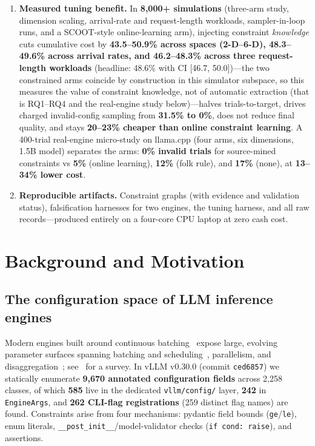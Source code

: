 \documentclass[journal]{IEEEtran}
\newcommand{\code}[1]{\texttt{#1}}
\begin{document}
\begin{enumerate}
  \item \textbf{Measured tuning benefit.} In \textbf{8{,}000+ simulations} (three-arm study, dimension scaling, arrival-rate and request-length workloads, sampler-in-loop runs, and a SCOOT-style online-learning arm), injecting constraint \emph{knowledge} cuts cumulative cost by \textbf{43.5--50.9\% across spaces (2-D--6-D), 48.3--49.6\% across arrival rates, and 46.2--48.3\% across three request-length workloads} (headline: 48.6\% with CI [46.7, 50.0])---the two constrained arms coincide by construction in this simulator subspace, so this measures the value of constraint knowledge, not of automatic extraction (that is RQ1--RQ4 and the real-engine study below)---halves trials-to-target, drives charged invalid-config sampling from \textbf{31.5\% to 0\%}, does not reduce final quality, and stays \textbf{20--23\% cheaper than online constraint learning}. A 400-trial real-engine micro-study on llama.cpp (four arms, six dimensions, 1.5B model) separates the arms: \textbf{0\% invalid trials} for source-mined constraints vs \textbf{5\%} (online learning), \textbf{12\%} (folk rule), and \textbf{17\%} (none), at \textbf{13--34\% lower cost}.
  \item \textbf{Reproducible artifacts.} Constraint graphs (with evidence and validation status), falsification harnesses for two engines, the tuning harness, and all raw records---produced entirely on a four-core CPU laptop at zero cash cost.
\end{enumerate}

\section{Background and Motivation}

\subsection{The configuration space of LLM inference engines}

Modern engines built around continuous batching~\cite{ref15} expose large, evolving parameter surfaces spanning batching and scheduling~\cite{ref14}, parallelism, and disaggregation~\cite{distserve,ray}; see~\cite{llmservesurvey} for a survey. In vLLM v0.30.0 (commit \code{ced6857}) we statically enumerate \textbf{9{,}670 annotated configuration fields} across 2{,}258 classes, of which \textbf{585} live in the dedicated \code{vllm/config/} layer, \textbf{242} in \code{EngineArgs}, and \textbf{262 CLI-flag registrations} (259 distinct flag names) are found. Constraints arise from four mechanisms: pydantic field bounds (\code{ge}/\code{le}), enum literals, \code{\_\_post\_init\_\_}/model-validator checks (\code{if cond: raise}), and assertions.
\end{document}
